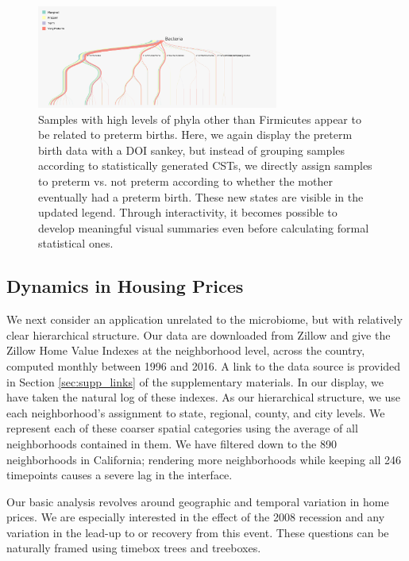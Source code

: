 \documentclass[12pt]{article}
\begin{document}
\begin{figure}
\centering
\includegraphics[width=300px]{figure/preterm_preterm}
\caption{Samples with high levels of phyla other than Firmicutes appear to be
  related to preterm births. Here, we again display the preterm birth data with
  a DOI sankey, but instead of grouping samples according to statistically
  generated CSTs, we directly assign samples to preterm vs. not preterm
  according to whether the mother eventually had a preterm birth. These new
  states are visible in the updated legend. Through interactivity, it becomes
  possible to develop meaningful visual summaries even before calculating formal
  statistical ones.}
\label{fig:pretermpreterm}
\end{figure}

\subsection{Dynamics in Housing Prices}\label{zillow-study}

We next consider an application unrelated to the microbiome, but with relatively
clear hierarchical structure. Our data are downloaded from Zillow and give the
Zillow Home Value Indexes at the neighborhood level, across the country,
computed monthly between 1996 and 2016. A link to the data source is provided in
Section \ref{sec:supp_links} of the supplementary materials. In our display, we
have taken the natural log of these indexes. As our hierarchical structure, we
use each neighborhood's assignment to state, regional, county, and city levels.
We represent each of these coarser spatial categories using the average of all
neighborhoods contained in them. We have filtered down to the 890 neighborhoods
in California; rendering more neighborhoods while keeping all 246 timepoints
causes a severe lag in the interface.

Our basic analysis revolves around geographic and temporal variation in home
prices. We are especially interested in the effect of the 2008 recession and any
variation in the lead-up to or recovery from this event. These questions can be
naturally framed using timebox trees and treeboxes.
\end{document}

